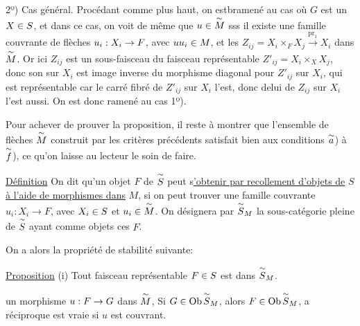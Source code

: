 2º) Cas général. Procédant comme plus haut, on estbramené au cas où $G$ est un $X\in S$, et dans ce cas, on voit de même que $u\in \overset{\sim}{M}$ sss il existe une famille couvrante de flèches $u_i:X_i\to F$, avec $uu_i\in M$, et les $Z_{ij}=X_i\times_F X_j\xrightarrow{\mathrm{pr}_1}X_i$ dans $\overset{\sim}{M}$. Or ici $Z_{ij}$ est un sous-faisceau du faisceau représentable $Z'_{ij}=X_i\times_X X_j$, donc son  sur $X_i$ est image inverse du morphisme diagonal pour $Z'_{ij}$ sur $X_i$, qui est représentable car le carré fibré de $Z'_{ij}$ sur $X_i$ l'est, donc delui de $Z_{ij}$ sur $X_i$ l'est aussi. On est donc ramené au cas 1º).

Pour achever de prouver la proposition, il reste à montrer que l'ensemble de flèches $\overset{\sim}{M}$ construit par les critères précédents satisfait bien aux conditions $\overset{\sim}{a}$) à $\overset{\sim}{f}$), ce qu'on laisse au lecteur le soin de faire.

\uline{Définition} On dit qu'un objet $F$ de $\overset{\sim}{S}$ peut s\uline{'obtenir par recollement d'objets de} $S$ \uline{à l'aide de morphismes dans} $M$, si on peut trouver une famille couvrante $u_i:X_i\to F$, avec $X_i\in S$ et $u_i\in \overset{\sim}{M}$. On désignera par $ {\overset{\sim}{S}}_M$ la sous-catégorie pleine de $\overset{\sim}{S}$ ayant comme objets ces $F$.

On a alors la propriété de stabilité suivante:



\uline{Proposition} \quad (i) Tout faisceau représentable $F\in S$ est dans $\overset{\sim}{S}_M$. 

 un morphisme $u:F\to G$  dans $\overset{\sim}{M}$,  Si $G\in\mathrm{Ob}\,\overset{\sim}{S}_M$, alors $F\in\mathrm{Ob}\,\overset{\sim}{S}_M$, a réciproque est vraie si $u$ est couvrant.

